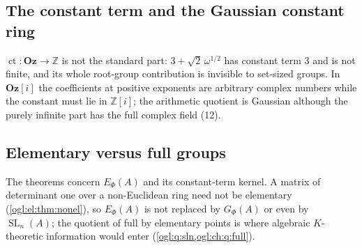 \documentclass[11pt,oneside]{article}
\numberwithin{equation}{section}
\theoremstyle{definition}
\theoremstyle{remark}
\newcommand{\Oz}{\mathbf{Oz}}
\newcommand{\GOz}{\mathbf{Oz}[i]}
\newcommand{\Z}{\mathbb Z}
\newcommand{\ct}{\operatorname{ct}}
\newcommand{\SL}{\operatorname{SL}}
\begin{document}
\subsection{The constant term and the Gaussian constant ring}
$\ct:\Oz\to\Z$ is not the standard part: $3+\sqrt2\,\omega^{1/2}$ has constant term
$3$ and is not finite, and its whole root-group contribution is invisible to
set-sized groups. In $\GOz$ the coefficients at positive exponents are arbitrary
complex numbers while the constant must lie in $\Z[i]$; the arithmetic quotient
is Gaussian although the purely infinite part has the full complex field (12).

\subsection{Elementary versus full groups}
The theorems concern $E_\Phi(A)$ and its constant-term kernel. A matrix of
determinant one over a non-Euclidean ring need not be elementary
(\cref{ogl:el:thm:nonel}), so $E_\Phi(A)$ is not replaced by $G_\Phi(A)$ or even by
$\SL_n(A)$; the quotient of full by elementary points is where algebraic
$K$-theoretic information would enter (\cref{ogl:q:sln,ogl:ch:q:full}).
\end{document}
